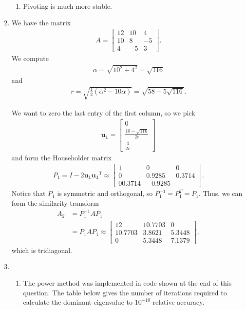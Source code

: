 \documentclass[10pt]{article}
\renewcommand{\vec}{\mathbf}
\begin{document}
\begin{enumerate}
\begin{enumerate}
    \item Pivoting is much more stable.
    \end{enumerate}

    \item We have the matrix \begin{align*}
        A = \begin{bmatrix}12 & 10 & 4 \\ 10 & 8 & -5 \\4 & -5 & 3\end{bmatrix}.
    \end{align*} We compute \begin{align*}
        \alpha = \sqrt{10^2+4^2} = \sqrt{116}
    \end{align*} and \begin{align*}
        r = \sqrt{\frac{1}{2}(\alpha ^2 - 10\alpha )} = \sqrt{58 - 5\sqrt{116}}.
    \end{align*}
    
    We want to zero the last entry of the first column, so we pick \begin{align*}
        \vec{u_1} = \begin{bmatrix}0 \\ \frac{10-\sqrt{116}}{2r} \\ \frac{4}{2r}\end{bmatrix}
    \end{align*} and form the Householder matrix \begin{align*}
        P_1 = I - 2\vec{u_1}\vec{u_1}^T \approx \begin{bmatrix}1 & 0 & 0 \\ 0 & 0.9285 & 0.3714 \\ 0 0.3714 & -0.9285\end{bmatrix}.
    \end{align*} Notice that \(P_1\) is symmetric and orthogonal, so \(P_1^{-1} = P_1^T = P_1\). Thus, we can form the similarity transform \begin{align*}
        A_2 &= P_1^{-1}AP_1 \\ &=P_1AP_1 \approx \begin{bmatrix}12 & 10.7703 & 0 \\ 10.7703 & 3.8621 & 5.3448 \\ 0 & 5.3448 & 7.1379\end{bmatrix},
    \end{align*} which is tridiagonal.

    \item \begin{enumerate}
        \item The power method was implemented in code shown at the end of this question. The table below gives the number of iterations required to calculate the dominant eigenvalue to \(10^{-10}\) relative accuracy.
        

\end{enumerate}
\end{enumerate}
\end{document}
